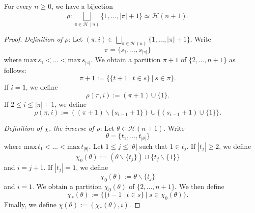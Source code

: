 \documentclass[10pt,a4paper]{amsart}
\begin{document}
\begin{proposition} \label{prop-bij}
For every $n \ge 0$, we have a bijection
\begin{equation} \label{the-bij}
\rho \colon \underset{\pi \in \mathcal{H}(n)}{\bigsqcup}\{1,\dots,|\pi|+1\} \simeq \mathcal{H}(n+1).
\end{equation}
\end{proposition}

\begin{proof}
\emph{Definition of $\rho$}: Let $(\pi,i) \in \underset{\pi \in \mathcal{H}(n)}{\bigsqcup}\{1,\dots,|\pi|+1\}$. Write 
\begin{equation*}
\pi=\{s_1,\dots,s_{|\pi|}\}
\end{equation*}
where $\mathrm{max}\,s_1<\dots<\mathrm{max}\,s_{|\pi|}$. 
We obtain a partition $\pi+1$ of $\{2,\dots,n+1\}$ as follows:
\begin{equation*}
\pi+1:=
\{\{t+1~|~t \in s\}~|~s \in \pi\}.
\end{equation*}
If $i=1$, we define
\begin{equation} \label{eq-rho-pi-1}
\rho(\pi,i):=(\pi+1) \cup \{1\}.
\end{equation}
If $2 \le i \le |\pi|+1$, we define 
\begin{equation} \label{eq-rho-pi-i}
\rho(\pi,i):=((\pi+1) \backslash \{s_{i-1}+1\}) \cup \{(s_{i-1}+1) \cup \{1\}\}.
\end{equation}

\emph{Definition of $\chi$, the inverse of $\rho$}: Let $\theta \in \mathcal{H}(n+1)$. Write
\begin{equation*}
\theta=\{t_1,\dots,t_{|\theta|}\}
\end{equation*}
where $\mathrm{max}\,t_1<\dots<\mathrm{max}\,t_{|\theta|}$. 
Let $1 \le j \le |\theta|$ such that $1 \in t_j$. If $|t_j| \ge 2$, we define
\begin{equation*}
\chi_0(\theta):=(\theta \backslash \{t_j\}) \cup \{t_j \backslash \{1\}\}
\end{equation*}
and $i=j+1$. If $|t_j|=1$, we define 
\begin{equation*}
\chi_0(\theta):=\theta \backslash \{t_j\}
\end{equation*}
and $i=1$. We obtain a partition $\chi_0(\theta)$ of $\{2,\dots,n+1\}$. We then define
\begin{equation*}
\chi_*(\theta):=\{\{t-1~|~t \in s\}~|~s \in \chi_0(\theta)\}.
\end{equation*}
Finally, we define $\chi(\theta):=(\chi_*(\theta),i)$.


\end{proof}
\end{document}
